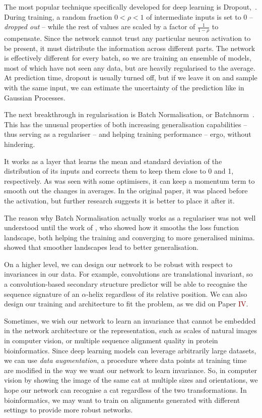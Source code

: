 The most popular technique  
specifically developed for deep learning is Dropout,~\citep{dropout}. 
During training, a random fraction $0 < \rho < 1$ of intermediate inputs is set to $0$ -- \emph{dropped out} --  while the rest of values are scaled by a factor of $\frac{1}{1-\rho}$ to compensate.
Since the network cannot trust any particular neuron activation to be present, it must distribute the information across different parts.
The network is effectively different for every batch, so we are training an ensemble of models, most of which have not seen any data, but are heavily regularised to the average.
At prediction time, dropout is usually turned off, but if we leave it on and sample with the same input, we can estimate the uncertainty of the prediction like in Gaussian Processes.

The next breakthrough in regularisation is Batch Normalisation, 
or Batchnorm~\citep{bn}.
This has the unusual properties of both increasing generalisation capabilities -- thus serving as a regulariser -- and helping training performance -- ergo, without hindering.

It works as a layer that learns the mean and standard deviation of the distribution of its inputs and corrects them to keep them close to 0 and 1, respectively.
As was seen with some optimisers, it can keep a momentum term to smooth out the changes in averages.
In the original paper, it was placed before the activation, but further research suggests it is better to place it after it.

The reason why Batch Normalisation actually works as a regulariser was not well understood until the work of \citet{how_bn_works}, who showed how it smooths the loss function landscape, both helping the training and converging to more generalised minima.
\citet{large_batch} showed that smoother landscapes lead to better generalisation.

On a higher level,
we can design our network to be robust with respect to invariances in our data.
For example, convolutions are translational invariant, so a convolution-based secondary structure predictor will be able to recognise the sequence signature of an $\alpha$-helix regardless of its relative position.
We can also  design our training and architecture to fit the problem, as we did on Paper \textcolor{Maroon}{IV}.

Sometimes,  we wish our network to learn an invariance that cannot be embedded in the network architecture or the representation, such as scales of natural images in computer vision, or multiple sequence alignment quality in protein bioinformatics.
Since deep learning models can leverage arbitrarily large datasets, we can use \emph{data augmentation}, a procedure where data points at training time are modified in the way we want our network to learn invariance.
So, in computer vision by showing the image of the same cat at multiple sizes and orientations, we hope our network can recognise a cat regardless of the two transformations.
In bioinformatics, we may want to train on alignments generated with different settings to provide more robust networks.


